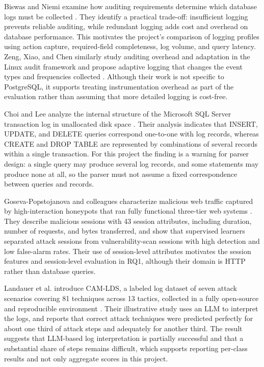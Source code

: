\documentclass[12pt,a4paper]{report}
\begin{document}
Biswas and Niemi examine how auditing requirements determine which database logs must be collected \cite{biswas_transforming_2011}. They identify a practical trade-off: insufficient logging prevents reliable auditing, while redundant logging adds cost and overhead on database performance. This motivates the project's comparison of logging profiles using action capture, required-field completeness, log volume, and query latency. Zeng, Xiao, and Chen similarly study auditing overhead and adaptation in the Linux audit framework and propose adaptive logging that changes the event types and frequencies collected \cite{zeng_auditing_2015}. Although their work is not specific to PostgreSQL, it supports treating instrumentation overhead as part of the evaluation rather than assuming that more detailed logging is cost-free.

Choi and Lee analyze the internal structure of the Microsoft SQL Server transaction log in unallocated disk space \cite{choi_forensic_2023}. Their analysis indicates that INSERT, UPDATE, and DELETE queries correspond one-to-one with log records, whereas CREATE and DROP TABLE are represented by combinations of several records within a single transaction. For this project the finding is a warning for parser design: a single query may produce several log records, and some statements may produce none at all, so the parser must not assume a fixed correspondence between queries and records.

Goseva-Popstojanova and colleagues characterize malicious web traffic captured by high-interaction honeypots that ran fully functional three-tier web systems \cite{goseva-popstojanova_characterization_2014}. They describe malicious sessions with 43 session attributes, including duration, number of requests, and bytes transferred, and show that supervised learners separated attack sessions from vulnerability-scan sessions with high detection and low false-alarm rates. Their use of session-level attributes motivates the session features and session-level evaluation in RQ1, although their domain is HTTP rather than database queries.

Landauer et al. introduce CAM-LDS, a labeled log dataset of seven attack scenarios covering 81 techniques across 13 tactics, collected in a fully open-source and reproducible environment \cite{landauer_cam-lds_2026}. Their illustrative study uses an LLM to interpret the logs, and reports that correct attack techniques were predicted perfectly for about one third of attack steps and adequately for another third. The result suggests that LLM-based log interpretation is partially successful and that a substantial share of steps remains difficult, which supports reporting per-class results and not only aggregate scores in this project.
\end{document}
